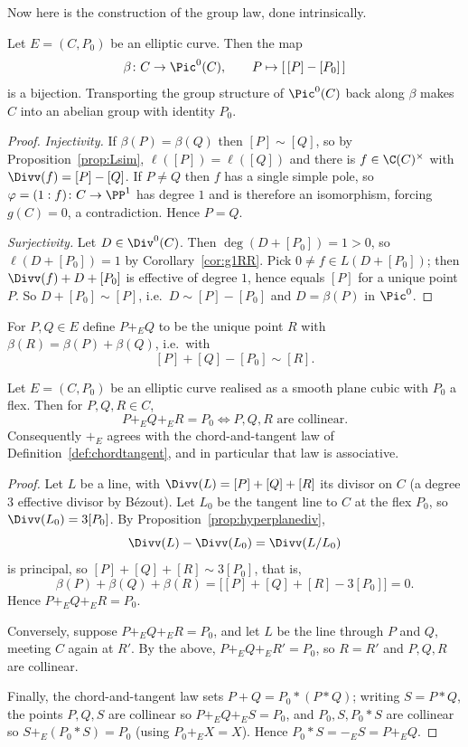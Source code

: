 Now here is the construction of the group law, done intrinsically.

\begin{theorem}\label{thm:elliptic}
	Let $E = (C,P_0)$ be an elliptic curve. Then the map
	$$\beta \colon C \to \Pic^0(C), \qquad P \mapsto [\,[P] - [P_0]\,]$$
	is a bijection. Transporting the group structure of $\Pic^0(C)$ back along $\beta$ makes $C$ into an abelian group with identity $P_0$.
\end{theorem}

\begin{proof}
	\emph{Injectivity.} If $\beta(P) = \beta(Q)$ then $[P]\sim[Q]$, so by Proposition~\ref{prop:Lsim}, $\ell([P]) = \ell([Q])$ and there is $f \in \C(C)^\times$ with $\Divv(f) = [P]-[Q]$. If $P \neq Q$ then $f$ has a single simple pole, so $\varphi = (1:f) \colon C \to \PP^1$ has degree $1$ and is therefore an isomorphism, forcing $g(C) = 0$, a contradiction. Hence $P = Q$.

	\emph{Surjectivity.} Let $D \in \Div^0(C)$. Then $\deg(D + [P_0]) = 1 > 0$, so $\ell(D+[P_0]) = 1$ by Corollary~\ref{cor:g1RR}. Pick $0 \neq f \in L(D+[P_0])$; then $\Divv(f) + D + [P_0]$ is effective of degree $1$, hence equals $[P]$ for a unique point $P$. So $D + [P_0]\sim [P]$, i.e.\ $D \sim [P]-[P_0]$ and $D = \beta(P)$ in $\Pic^0$.
\end{proof}

\begin{definition}
	For $P,Q \in E$ define $P +_E Q$ to be the unique point $R$ with $\beta(R) = \beta(P)+\beta(Q)$, i.e.\ with
	$$[P] + [Q] - [P_0] \sim [R].$$
\end{definition}

\begin{theorem}
	Let $E = (C,P_0)$ be an elliptic curve realised as a smooth plane cubic with $P_0$ a flex. Then for $P,Q,R \in C$,
	$$P +_E Q +_E R = P_0 \iff P, Q, R \text{ are collinear.}$$
	Consequently $+_E$ agrees with the chord-and-tangent law of Definition~\ref{def:chordtangent}, and in particular that law is associative.
\end{theorem}

\begin{proof}
	Let $L$ be a line, with $\Divv(L) = [P]+[Q]+[R]$ its divisor on $C$ (a degree $3$ effective divisor by B\'ezout). Let $L_0$ be the tangent line to $C$ at the flex $P_0$, so $\Divv(L_0) = 3[P_0]$. By Proposition~\ref{prop:hyperplanediv},
	$$\Divv(L) - \Divv(L_0) = \Divv(L/L_0)$$
	is principal, so $[P]+[Q]+[R] \sim 3[P_0]$, that is,
	$$\beta(P)+\beta(Q)+\beta(R) = \big[[P]+[Q]+[R] - 3[P_0]\big] = 0.$$
	Hence $P+_EQ+_ER = P_0$.

	Conversely, suppose $P +_E Q +_E R = P_0$, and let $L$ be the line through $P$ and $Q$, meeting $C$ again at $R'$. By the above, $P+_EQ+_ER' = P_0$, so $R = R'$ and $P,Q,R$ are collinear.

	Finally, the chord-and-tangent law sets $P + Q = P_0 * (P*Q)$; writing $S = P*Q$, the points $P,Q,S$ are collinear so $P+_EQ+_ES = P_0$, and $P_0, S, P_0*S$ are collinear so $S +_E (P_0*S) = P_0$ (using $P_0 +_E X = X$). Hence $P_0 * S = -_E S = P +_E Q$.
\end{proof}

